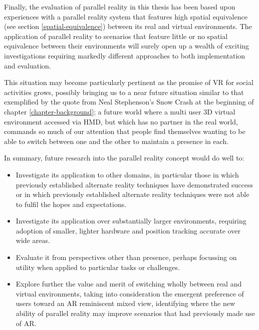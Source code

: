 Finally, the evaluation of parallel reality in this thesis has been based upon experiences with a parallel reality system that features high spatial equivalence (see section \ref{spatial-equivalence}) between its real and virtual environments. The application of parallel reality to scenarios that feature little or no spatial equivalence between their environments will surely open up a wealth of exciting investigations requiring markedly different approaches to both implementation and evaluation.

This situation may become particularly pertinent as the promise of VR for social activities grows, possibly bringing us to a near future situation similar to that exemplified by the quote from Neal Stephenson's Snow Crash at the beginning of chapter \ref{chapter-background}; a future world where a multi user 3D virtual environment accessed via HMD, but which has no partner in the real world, commands so much of our attention that people find themselves wanting to be able to switch between one and the other to maintain a presence in each.

In summary, future research into the parallel reality concept would do well to:
\begin{itemize}
	\item Investigate its application to other domains, in particular those in which previously established alternate reality techniques have demonstrated success or in which previously established alternate reality techniques were not able to fulfil the hopes and expectations.

	\item Investigate its application over substantially larger environments, requiring adoption of smaller, lighter hardware and position tracking accurate over wide areas.

	\item Evaluate it from perspectives other than presence, perhaps focussing on utility when applied to particular tasks or challenges.

	\item Explore further the value and merit of switching wholly between real and virtual environments, taking into consideration the emergent preference of users toward an AR reminiscent mixed view, identifying where the new ability of parallel reality may improve scenarios that had previously made use of AR.
\end{itemize}

